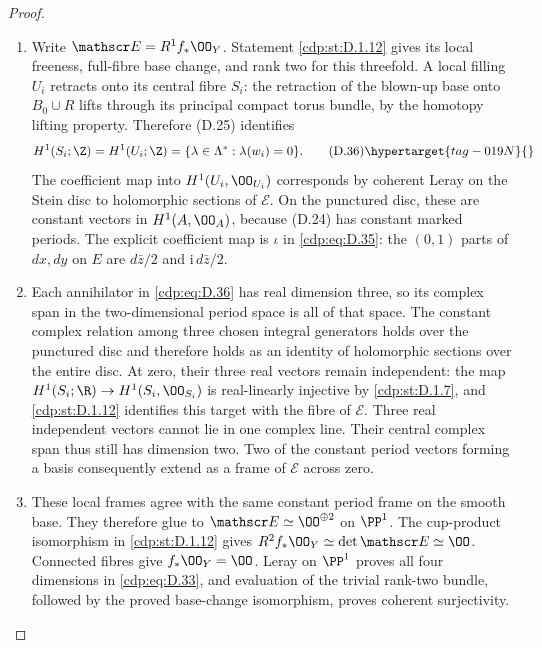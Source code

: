 \begin{proof}

\begin{enumerate}[label={$\langle1\rangle$\arabic*.},leftmargin=*]
\item Write $\mathscr E=R^1f_*\OO_Y$. Statement \ref{cdp:st:D.1.12} gives its
local freeness, full-fibre base change, and rank two for this
threefold. A local filling $U_i$ retracts onto its central
fibre $S_i$: the retraction of the blown-up base onto
$B_0\cup R$ lifts through its principal compact torus
bundle, by the homotopy lifting property. Therefore (D.25)
identifies
\[
 H^1(S_i;\Z)=H^1(U_i;\Z)
          =\{\lambda\in\Lambda^*:\lambda(w_i)=0\}.
\tag{D.36}\hypertarget{tag-019N}{}\label{cdp:eq:D.36}
\]
The coefficient map into $H^1(U_i,\OO_{U_i})$
corresponds by coherent Leray on the Stein disc to
holomorphic sections of $\mathscr E$. On the punctured
disc, these are constant vectors in $H^1(A,\OO_A)$,
because (D.24) has constant marked periods. The explicit
coefficient map is $\iota$ in \eqref{cdp:eq:D.35}: the $(0,1)$ parts
of $dx,dy$ on $E$ are $d\bar z/2$ and
$\mathrm i\,d\bar z/2$.

\item Each annihilator in \eqref{cdp:eq:D.36} has real dimension three, so
its complex span in the two-dimensional period space is
all of that space. The constant complex relation among
three chosen integral generators holds over the
punctured disc and therefore holds as an identity of
holomorphic sections over the entire disc. At zero,
their three real vectors remain independent: the map
$H^1(S_i;\R)\to H^1(S_i,\OO_{S_i})$ is real-linearly
injective by \ref{cdp:st:D.1.7}, and \ref{cdp:st:D.1.12} identifies this target
with the fibre of $\mathscr E$. Three real independent
vectors cannot lie in one complex line. Their central
complex span thus still has dimension two. Two of the
constant period vectors forming a basis consequently
extend as a frame of $\mathscr E$ across zero.

\item These local frames agree with the same constant period
frame on the smooth base. They therefore glue to
$\mathscr E\simeq\OO^{\oplus2}$ on $\PP^1$.
The cup-product isomorphism in \ref{cdp:st:D.1.12} gives
$R^2f_*\OO_Y\simeq\det\mathscr E\simeq\OO$.
Connected fibres give $f_*\OO_Y=\OO$. Leray on $\PP^1$
proves all four dimensions in \eqref{cdp:eq:D.33}, and evaluation
of the trivial rank-two bundle, followed by the proved
base-change isomorphism, proves coherent surjectivity.


\end{enumerate}
\end{proof}
